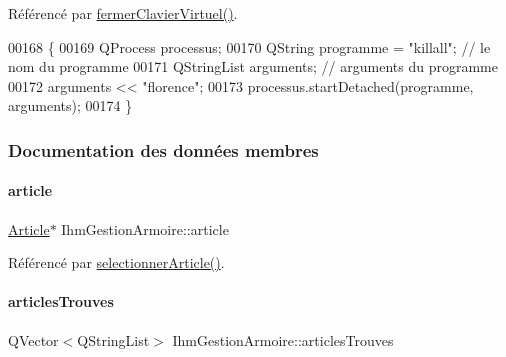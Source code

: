 Référencé par \hyperlink{class_ihm_gestion_armoire_a527e704e792dd5634b3c0a738a922429}{fermer\+Clavier\+Virtuel()}.


\begin{DoxyCode}
00168 \{
00169     QProcess processus;
00170     QString programme = \textcolor{stringliteral}{"killall"}; \textcolor{comment}{// le nom du programme}
00171     QStringList arguments; \textcolor{comment}{// arguments du programme}
00172     arguments << \textcolor{stringliteral}{"florence"};
00173     processus.startDetached(programme, arguments);
00174 \}
\end{DoxyCode}


\subsubsection{Documentation des données membres}
\mbox{\label{class_ihm_gestion_armoire_a0a3af042f7a9d5a6bac634e2b053828d}} 
\paragraph{\texorpdfstring{article}{article}}
{\footnotesize\ttfamily \hyperlink{class_article}{Article}$\ast$ Ihm\+Gestion\+Armoire\+::article\hspace{0.3cm}{\ttfamily [private]}}



Référencé par \hyperlink{class_ihm_gestion_armoire_a28970b692994ad7201c03decd42ec0e5}{selectionner\+Article()}.

\mbox{\label{class_ihm_gestion_armoire_a21821dc4f15d87125efb933991eb4385}} 
\paragraph{\texorpdfstring{articles\+Trouves}{articlesTrouves}}
{\footnotesize\ttfamily Q\+Vector$<$Q\+String\+List$>$ Ihm\+Gestion\+Armoire\+::articles\+Trouves\hspace{0.3cm}{\ttfamily [private]}}



